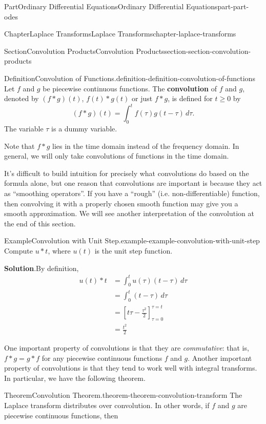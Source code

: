 \documentclass[twoside,10pt,]{book}
\newcommand{\blocktitlefont}{\relax}
\newcommand{\terminology}[1]{\textbf{#1}}
\numberwithin{equation}{part}
\begin{document}
\begin{partptx}{Part}{Ordinary Differential Equations}{}{Ordinary Differential Equations}{}{}{part-part-odes}
\begin{chapterptx}{Chapter}{Laplace Transforms}{}{Laplace Transforms}{}{}{chapter-laplace-transforms}
\begin{sectionptx}{Section}{Convolution Products}{}{Convolution Products}{}{}{section-section-convolution-products}
\begin{definition}{Definition}{Convolution of Functions.}{definition-definition-convolution-of-functions}
%
Let \(f\) and \(g\) be piecewise continuous functions. The \terminology{convolution} of \(f\) and \(g\), denoted by \((f\ast g)(t)\), \(f(t)\ast g(t)\) or just \(f\ast g\), is defined for \(t\geq0\) by%
\begin{equation*}
(f\ast g)(t) = \int_{0}^{t} f(\tau)g(t-\tau)\,d\tau.
\end{equation*}
The variable \(\tau\) is a dummy variable.%
\end{definition}
Note that \(f\ast g\) lies in the time domain instead of the frequency domain. In general, we will only take convolutions of functions in the time domain.%
\par
It's difficult to build intuition for precisely what convolutions do based on the formula alone, but one reason that convolutions are important is because they act as ``smoothing operators''. If you have a ``rough'' (i.e. non-differentiable) function, then convolving it with a properly chosen smooth function may give you a smooth approximation. We will see another interpretation of the convolution at the end of this section.%
\begin{example}{Example}{Convolution with Unit Step.}{example-example-convolution-with-unit-step}%
Compute \(u\ast t\), where \(u(t)\) is the unit step function.%
\par\smallskip%
\noindent\textbf{\blocktitlefont Solution}.\hypertarget{solution-example-convolution-with-unit-step-c}{}\quad{}By definition,%
\begin{align*}
u(t)\ast t &= \int_{0}^{t}u(\tau)(t-\tau)\,d\tau \\
&= \int_{0}^{t}(t-\tau)\,d\tau \\
&= \left[t\tau-\frac{\tau^{2}}{2}\right]_{\tau=0}^{\tau=t} \\
&= \frac{t^{2}}{2}
\end{align*}
%
\end{example}
One important property of convolutions is that they are \emph{commutative}: that is, \(f\ast g = g\ast f\) for any piecewise continuous functions \(f\) and \(g\). Another important property of convolutions is that they tend to work well with integral transforms. In particular, we have the following theorem.%
\begin{theorem}{Theorem}{Convolution Theorem.}{}{theorem-theorem-convolution-transform}%
%
The Laplace transform distributes over convolution. In other words, if \(f\) and \(g\) are piecewise continuous functions, then%
\begin{equation*}

\end{equation*}
\end{theorem}
\end{sectionptx}
\end{chapterptx}
\end{partptx}
\end{document}
